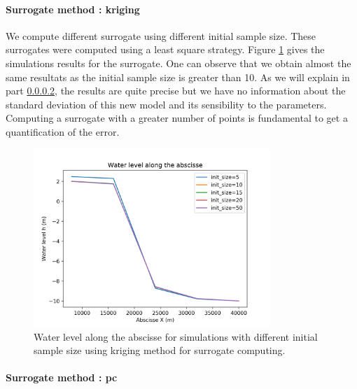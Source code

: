 \paragraph{Surrogate method : kriging}
\hspace{1cm}

We compute different surrogate using different initial sample size. These surrogates were computed using a least square strategy. Figure \ref{influence_init_size_method_surrogate_kriging} gives the simulations results for the surrogate. One can observe that we obtain almost the same resultats as the initial sample size is greater than 10. As we will explain in part \ref{}, the results are quite precise but we have no information about the standard deviation of this new model and its sensibility to the parameters. Computing a surrogate with a greater number of points is fundamental to get a quantification of the error.
\begin{figure}
  \centering
  \includegraphics[width=0.8\textwidth]{images/influence_init_size_method_surrogate_kriging.png}
  \caption{Water level along the abscisse for simulations with different initial sample size using kriging method for surrogate computing.}
  	\label{influence_init_size_method_surrogate_kriging}
\end{figure}

\paragraph{Surrogate method : pc}
\hspace{1cm}

